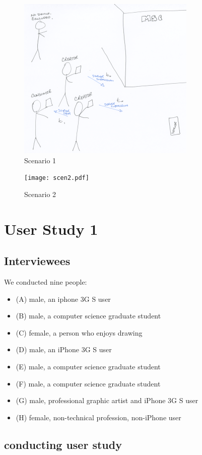 \documentclass{chi2009}
\begin{document}
\begin{figure}
\centering
\includegraphics[width=.50\textwidth]{scen1.pdf}
\caption{Scenario 1} \label{fig:s1}
\end{figure}

\begin{figure}
\centering
\texttt{[image: scen2.pdf]}
\caption{Scenario 2} \label{fig:s2}
\end{figure}



\section{User Study 1}
\subsection{Interviewees}
We conducted nine people:

\begin{itemize}
\item (A) male, an iphone 3G S user
\item (B) male, a computer science graduate student
\item (C) female, a person who enjoys drawing
\item (D) male, an iPhone 3G S user
\item (E) male, a computer science graduate student
\item (F) male, a computer science graduate student
\item (G) male, professional graphic artist and iPhone 3G S user
\item (H) female, non-technical profession, non-iPhone user
\end{itemize}

\subsection{conducting user study}
\end{document}
